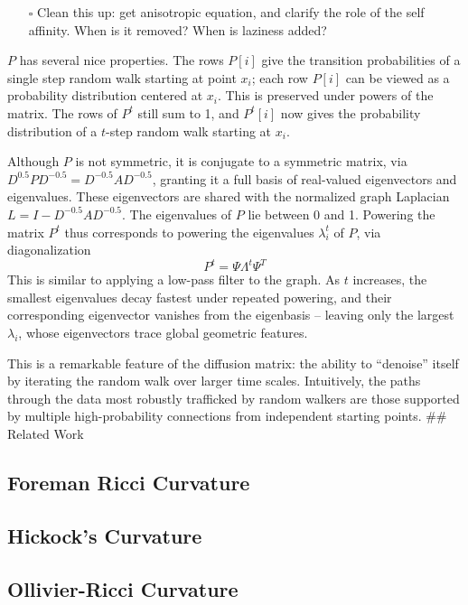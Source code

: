\documentclass[
]{agujournal2019}
\providecommand{\tightlist}{%
  \setlength{\itemsep}{0pt}\setlength{\parskip}{0pt}}\usepackage{longtable,booktabs,array}
\begin{document}
\begin{itemize}
\tightlist
\item[$\square$]
  Clean this up: get anisotropic equation, and clarify the role of the
  self affinity. When is it removed? When is laziness added?
\end{itemize}

\(P\) has several nice properties. The rows \(P[i]\) give the transition
probabilities of a single step random walk starting at point \(x_{i}\);
each row \(P[i]\) can be viewed as a probability distribution centered
at \(x_{i}\). This is preserved under powers of the matrix. The rows of
\(P^t\) still sum to 1, and \(P^t[i]\) now gives the probability
distribution of a \(t\)-step random walk starting at \(x_{i}\).

Although \(P\) is not symmetric, it is conjugate to a symmetric matrix,
via \(D^{0.5}PD^{-0.5} = D^{-0.5}AD^{-0.5}\), granting it a full basis
of real-valued eigenvectors and eigenvalues. These eigenvectors are
shared with the normalized graph Laplacian
\(L = I - D^{-0.5}AD^{-0.5}\). The eigenvalues of \(P\) lie between 0
and 1. Powering the matrix \(P^t\) thus corresponds to powering the
eigenvalues \(\lambda_{i}^t\) of \(P\), via diagonalization \[
P^t = \Psi \Lambda^t \Psi^T
\] This is similar to applying a low-pass filter to the graph. As \(t\)
increases, the smallest eigenvalues decay fastest under repeated
powering, and their corresponding eigenvector vanishes from the
eigenbasis -- leaving only the largest \(\lambda_{i}\), whose
eigenvectors trace global geometric features.

This is a remarkable feature of the diffusion matrix: the ability to
``denoise'' itself by iterating the random walk over larger time scales.
Intuitively, the paths through the data most robustly trafficked by
random walkers are those supported by multiple high-probability
connections from independent starting points. \#\# Related Work

\subsection{Foreman Ricci Curvature}\label{foreman-ricci-curvature}

\subsection{Hickock's Curvature}\label{hickocks-curvature}

\subsection{Ollivier-Ricci Curvature}\label{ollivier-ricci-curvature}
\end{document}
